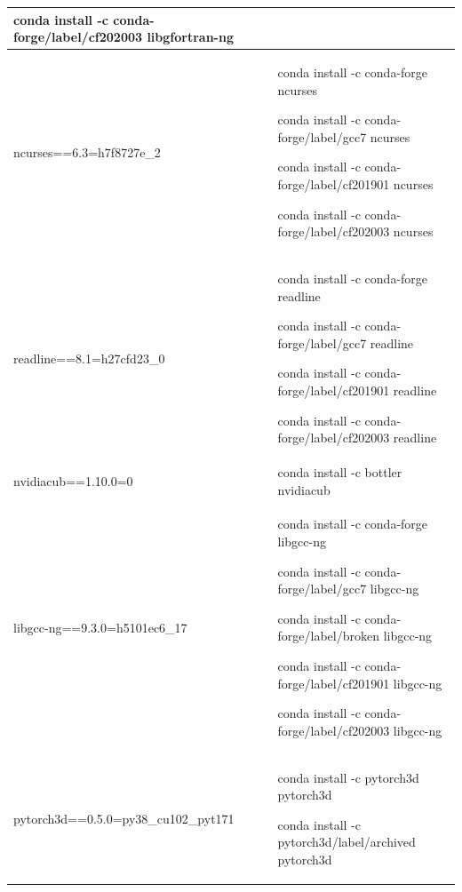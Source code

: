 \begin{tabular}{ |p{8cm}||p{8cm}|  }
	conda install -c conda-forge/label/cf202003 libgfortran-ng\\
\hline


ncurses==6.3=h7f8727e\_2  &
	conda install -c conda-forge ncurses\hline

	conda install -c conda-forge/label/gcc7 ncurses\hline

	conda install -c conda-forge/label/cf201901 ncurses\hline

	conda install -c conda-forge/label/cf202003 ncurses\\
\hline


  readline==8.1=h27cfd23\_0 &
	conda install -c conda-forge readline\hline

	conda install -c conda-forge/label/gcc7 readline\hline

	conda install -c conda-forge/label/cf201901 readline\hline

	conda install -c conda-forge/label/cf202003 readline\\
\hline

  
  nvidiacub==1.10.0=0 &	conda install -c bottler nvidiacub\\
\hline


  libgcc-ng==9.3.0=h5101ec6\_17  &
	conda install -c conda-forge libgcc-ng\hline

	conda install -c conda-forge/label/gcc7 libgcc-ng\hline

	conda install -c conda-forge/label/broken libgcc-ng\hline

	conda install -c conda-forge/label/cf201901 libgcc-ng\hline

	conda install -c conda-forge/label/cf202003 libgcc-ng\\
\hline


  pytorch3d==0.5.0=py38\_cu102\_pyt171  &
	conda install -c pytorch3d pytorch3d\hline

	conda install -c pytorch3d/label/archived pytorch3d\\
\hline


\end{tabular}

\medskip

